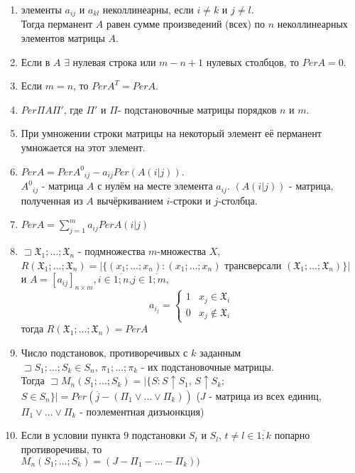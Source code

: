\begin{enumerate}
	\item \opr элементы $a_{ij}$ и $a_{kl}$ неколлинеарны, если $i\neq k$ и $j\neq l$.\\Тогда перманент $A$ равен сумме произведений (всех) по $n$ неколлинеарных элементов матрицы $A$.
	\item Если в $A$ $\exists$ нулевая строка или $m-n+1$ нулевых столбцов, то $Per A=0$.
 	\item Если $m=n$, то $Per A^T = Per A$.
	\item $Per \Pi A\Pi'$, где $\Pi'$ и $\Pi$- подстановочные матрицы порядков $n$ и $m$.
	\item При умножении строки матрицы на некоторый элемент её перманент умножается на этот элемент.
	\item $Per A=Per {A^0}_{ij} - a_{ij} Per(A(i|j))$. \\${A^0}_{ij}$ - матрица $A$ с нулём на месте элемента $a_{ij}$. $(A(i|j))$ - матрица, полученная из $A$ вычёркиванием $i$-строки и $j$-столбца.
	\item $Per A = \sum\limits_{j=1}^m a_{ij} Per A(i|j)$
	\item $\sqsupset \mathfrak{X}_1; \ldots;\mathfrak{X}_n$ - подмножества $m$-множества $X$, \\$R(\mathfrak{X}_1;\ldots;\mathfrak{X}_n)=|\{(x_1;\ldots;x_n):(x_1;\ldots;x_n)$ трансверсали $(\mathfrak{X}_1;\ldots;\mathfrak{X}_n)\}|$ \\и $A=[a_{ij}]_{n \times m},i\in\overline{1;n}$,$j\in\overline{1;m}$,  
        \begin{equation*}
            a_{i_j} = 
            \begin{cases}
            1 &\text{$x_j \in \mathfrak{X}_i$}\\
            0 &\text{$x_j \notin \mathfrak{X}_i$}
            \end{cases}
            \end{equation*}
            тогда $R(\mathfrak{X}_1;\ldots;\mathfrak{X}_n)=PerA$
    \item Число подстановок, противоречивых с $k$ заданным \\$\sqsupset S_1;\ldots;S_k \in S_n$, $\pi_1;\ldots;\pi_k$ - их подстановочные матрицы. \\ Тогда $\sqsupset M_n(S_1;\ldots;S_k)=|\{S:S\uparrow S_1$, $S\uparrow S_k$; $S\in S_n \} | = Per(\overline j-(\Pi_1\vee \ldots \vee \Pi_k))$ ($J$ - матрица из всех единиц, $\Pi_1\vee \ldots \vee \Pi_k$ - поэлементная дизъюнкция)
    \item Если в условии пункта 9 подстановки $S_t$ и $S_l$, $t \neq l \in \overline{1;k}$ попарно противоречивы, то \\$M_n(S_1; \ldots; S_k)=(J - \Pi_1 - \ldots - \Pi_k))$

\end{enumerate}
